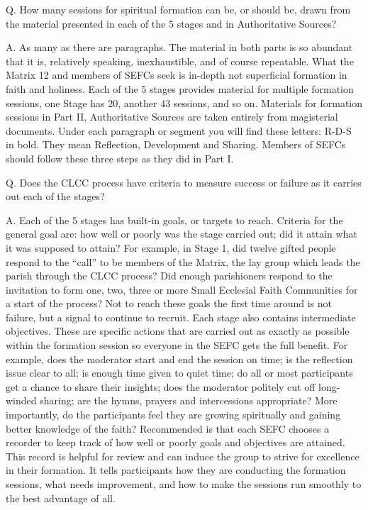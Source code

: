 \documentclass[oneside]{book}
\begin{document}
Q. How many sessions for spiritual formation can be, or should be, drawn from
the material presented in each of the 5 stages and in Authoritative Sources?

A. As many as there are paragraphs. The material in both parts is so abundant
that it is, relatively speaking, inexhaustible, and of course repeatable. What
the Matrix 12 and members of SEFCs seek is in-depth not superficial formation in
faith and holiness. Each of the 5 stages provides material for multiple
formation sessions, one Stage has 20, another 43 sessions, and so on.
Materials for formation sessions in Part II, Authoritative Sources are taken
entirely from magisterial documents. Under each paragraph or segment you will
find these letters: R-D-S in bold. They mean Reflection, Development and
Sharing. Members of SEFCs should follow these three steps as they did in Part I.

Q. Does the CLCC process have criteria to measure success or failure as it
carries out each of the stages?

A. Each of the 5 stages has built-in goals, or targets to reach. Criteria for
the general goal are: how well or poorly was the stage carried out; did it
attain what it was supposed to attain? For example, in Stage 1, did twelve
gifted people respond to the ``call'' to be members of the Matrix, the lay group
which leads the parish through the CLCC process? Did enough parishioners respond
to the invitation to form one, two, three or more Small Ecclesial Faith
Communities for a start of the process? Not to reach these goals the first time
around is not failure, but a signal to continue to recruit.
Each stage also contains intermediate objectives. These are specific actions
that are carried out as exactly as possible within the formation session so
everyone in the SEFC gets the full benefit. For example, does the moderator
start and end the session on time; is the reflection issue clear to all; is
enough time given to quiet time; do all or most participants get a chance to
share their insights; does the moderator politely cut off long-winded sharing;
are the hymns, prayers and intercessions appropriate? More importantly, do the
participants feel they are growing spiritually and gaining better knowledge of
the faith?
Recommended is that each SEFC chooses a recorder to keep track of how well or
poorly goals and objectives are attained. This record is helpful for review and
can induce the group to strive for excellence in their formation. It tells
participants how they are conducting the formation sessions, what needs
improvement, and how to make the sessions run smoothly to the best advantage of
all.
\end{document}
